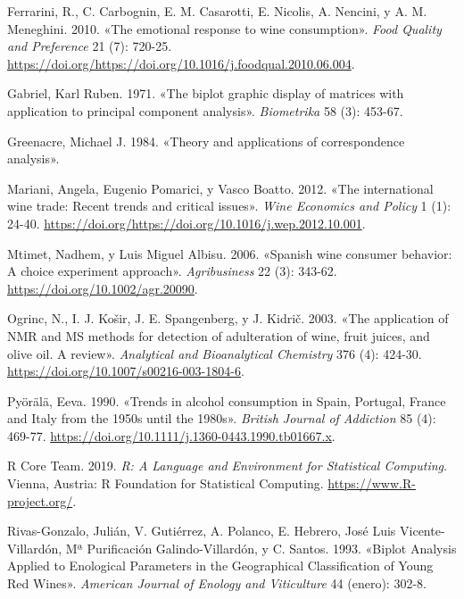 \documentclass[
  10pt,
  spanish,
]{article}
\begin{document}
\leavevmode\hypertarget{ref-ferranini2010}{}%
Ferrarini, R., C. Carbognin, E. M. Casarotti, E. Nicolis, A. Nencini, y
A. M. Meneghini. 2010. «The emotional response to wine consumption».
\emph{Food Quality and Preference} 21 (7): 720-25.
\url{https://doi.org/https://doi.org/10.1016/j.foodqual.2010.06.004}.

\leavevmode\hypertarget{ref-gabriel1971}{}%
Gabriel, Karl Ruben. 1971. «The biplot graphic display of matrices with
application to principal component analysis». \emph{Biometrika} 58 (3):
453-67.

\leavevmode\hypertarget{ref-greenacre1984}{}%
Greenacre, Michael J. 1984. «Theory and applications of correspondence
analysis».

\leavevmode\hypertarget{ref-mariani2012}{}%
Mariani, Angela, Eugenio Pomarici, y Vasco Boatto. 2012. «The
international wine trade: Recent trends and critical issues». \emph{Wine
Economics and Policy} 1 (1): 24-40.
\url{https://doi.org/https://doi.org/10.1016/j.wep.2012.10.001}.

\leavevmode\hypertarget{ref-mtimet2006}{}%
Mtimet, Nadhem, y Luis Miguel Albisu. 2006. «Spanish wine consumer
behavior: A choice experiment approach». \emph{Agribusiness} 22 (3):
343-62. \url{https://doi.org/10.1002/agr.20090}.

\leavevmode\hypertarget{ref-ogrinc_application_2003}{}%
Ogrinc, N., I. J. Košir, J. E. Spangenberg, y J. Kidrič. 2003. «The
application of NMR and MS methods for detection of adulteration of wine,
fruit juices, and olive oil. A review». \emph{Analytical and
Bioanalytical Chemistry} 376 (4): 424-30.
\url{https://doi.org/10.1007/s00216-003-1804-6}.

\leavevmode\hypertarget{ref-pyorala1990}{}%
Pyörälä, Eeva. 1990. «Trends in alcohol consumption in Spain, Portugal,
France and Italy from the 1950s until the 1980s». \emph{British Journal
of Addiction} 85 (4): 469-77.
\url{https://doi.org/10.1111/j.1360-0443.1990.tb01667.x}.

\leavevmode\hypertarget{ref-r2019}{}%
R Core Team. 2019. \emph{R: A Language and Environment for Statistical
Computing}. Vienna, Austria: R Foundation for Statistical Computing.
\url{https://www.R-project.org/}.

\leavevmode\hypertarget{ref-rivasgonzalo_etal_1993}{}%
Rivas-Gonzalo, Julián, V. Gutiérrez, A. Polanco, E. Hebrero, José Luis
Vicente-Villardón, Mª Purificación Galindo-Villardón, y C. Santos. 1993.
«Biplot Analysis Applied to Enological Parameters in the Geographical
Classification of Young Red Wines». \emph{American Journal of Enology
and Viticulture} 44 (enero): 302-8.
\end{document}

